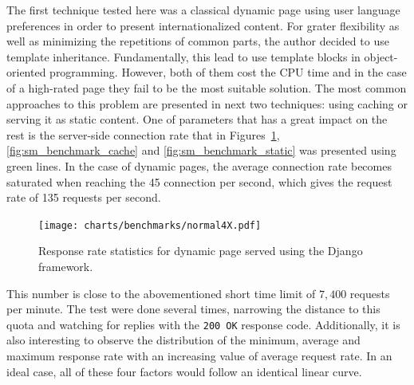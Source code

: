 The first technique tested here was a classical dynamic page using user language preferences in order to present internationalized content. For grater flexibility as well as minimizing the repetitions of common parts, the author decided to use template inheritance. Fundamentally, this lead to use template blocks in object-oriented programming. However, both of them cost the CPU time and in the case of a high-rated page they fail to be the most suitable solution. The most common approaches to this problem are presented in next two techniques: using caching or serving it as static content. One of parameters that has a great impact on the rest is the server-side connection rate that in Figures~\ref{fig:sm_benchmark_normal}, \ref{fig:sm_benchmark_cache} and \ref{fig:sm_benchmark_static} was presented using green lines. In the case of dynamic pages, the average connection rate becomes saturated when reaching the 45 connection per second, which gives the request rate of 135 requests per second.
\begin{figure}[ht]
  \begin{center}
              \texttt{[image: charts/benchmarks/normal4X.pdf]}
  \end{center}
  \caption{Response rate statistics for dynamic page served using the Django framework.}
              \label{fig:sm_benchmark_normal}
\end{figure}
This number is close to the abovementioned short time limit of $7, 400$ requests per minute. The test were done several times, narrowing the distance to this quota and watching for replies with the \texttt{200 OK} response code. Additionally, it is also interesting to observe the distribution of the minimum, average and maximum response rate with an increasing value of average request rate. In an ideal case, all of these four factors would follow an identical linear curve.    
 
